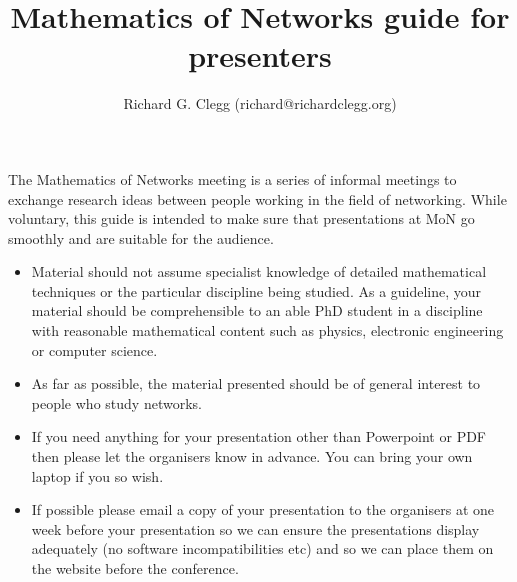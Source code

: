 \documentclass{article}
\title{Mathematics of Networks guide for presenters}
\author{Richard G. Clegg (richard@richardclegg.org)}
\begin{document}
\maketitle

The Mathematics of Networks meeting is a series of informal meetings to 
exchange research ideas between people working in the field of networking.
While voluntary, this guide is intended to make sure that presentations 
at MoN go smoothly and are suitable for the audience.

\begin{itemize}
\item Material should not assume specialist knowledge of detailed mathematical
techniques or the particular discipline being studied.  As a guideline, your
material should be comprehensible to an able PhD student in a discipline with
reasonable mathematical content such as physics, electronic engineering or computer 
science.
\item As far as possible, the material presented should be of general interest 
to people who study networks.  
\item If you need anything for your presentation other than Powerpoint 
or PDF then please let the organisers know in advance.  You can bring your
own laptop if you so wish.
\item If possible please email a copy of your presentation to the organisers at one week
before your presentation so we can ensure the presentations display
adequately (no software incompatibilities etc) and so we can place them on the 
website before the conference.
\end{itemize}
\end{document}
